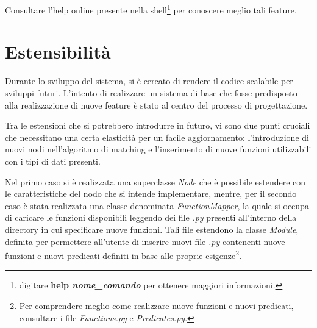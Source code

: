 Consultare l'help online presente nella shell\footnote{digitare \textbf{help \emph{nome_comando}} per ottenere maggiori informazioni.} per conoscere meglio tali feature.

\section{Estensibilità}
Durante lo sviluppo del sistema, si è cercato di rendere il codice scalabile per sviluppi futuri. L'intento di realizzare un sistema di base che fosse predisposto alla realizzazione di nuove feature è stato al centro del processo di progettazione.

Tra le estensioni che si potrebbero introdurre in futuro, vi sono due punti cruciali che necessitano una certa elasticità per un facile aggiornamento: l'introduzione di nuovi nodi nell'algoritmo di matching e l'inserimento di nuove funzioni utilizzabili con i tipi di dati presenti.

Nel primo caso si è realizzata una superclasse \emph{Node} che è possibile estendere con le caratteristiche del nodo che si intende implementare, mentre, per il secondo caso è stata realizzata una classe denominata \emph{FunctionMapper}, la quale si occupa di caricare le funzioni disponibili leggendo dei file \emph{.py} presenti all'interno della directory in cui specificare nuove funzioni. Tali file estendono la classe \emph{Module}, definita per permettere all'utente di inserire nuovi file \emph{.py} contenenti nuove funzioni e nuovi predicati definiti in base alle proprie esigenze\footnote{Per comprendere meglio come realizzare nuove funzioni e nuovi predicati, consultare i file \emph{Functions.py} e \emph{Predicates.py}.}.

